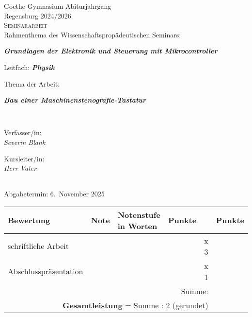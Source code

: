 
\begin{titlepage}

  \centering

  Goethe-Gymnasium \hfill Abiturjahrgang\\
  Regensburg \hfill 2024/2026\\[1cm]

  \textsc{\Large Seminararbeit}\\[1cm]

  \large Rahmenthema des Wissenschaftspropädeutischen Seminars:

  \textbf{\emph{Grundlagen der Elektronik und Steuerung mit Mikrocontroller}}

  Leitfach: \textbf{\emph{Physik}}\\[2cm]

  {\Large
  Thema der Arbeit:

  \textbf{\emph{Bau einer Maschinenstenografie-Tastatur}}
  }\\[2cm]

  \begin{minipage}{0.4\textwidth}
    \begin{flushleft} \large
      Verfasser/in: \\
      \emph{Severin Blank}
    \end{flushleft}
  \end{minipage}
  \begin{minipage}{0.4\textwidth}
    \begin{flushright} \large
      Kursleiter/in: \\
      \emph{Herr Vater}
    \end{flushright}
  \end{minipage}\\[1.5cm]

  Abgabetermin: \hfill 6.~November 2025\\[1cm]

  \normalsize

  \begin{tabularx}{\textwidth}{l|c|X|c|c|c|}
    \textbf{Bewertung}                                                          & \textbf{Note} & \textbf{Notenstufe} in Worten & \textbf{Punkte} &     & \textbf{Punkte} \\ \hline
    schriftliche Arbeit                                                         &               &                               &                 & x 3 &                 \\ \hline
    Abschlusspräsentation                                                       &               &                               &                 & x 1 &                 \\ \hline
    \multicolumn{5}{r|}{Summe:}                                                 &                                                                                         \\ \cline{6-6}
    \multicolumn{5}{r|}{\textbf{Gesamtleistung}\small{ = Summe : 2 (gerundet)}} &                                                                                         \\ \cline{6-6} %
  \end{tabularx}


\end{titlepage}
